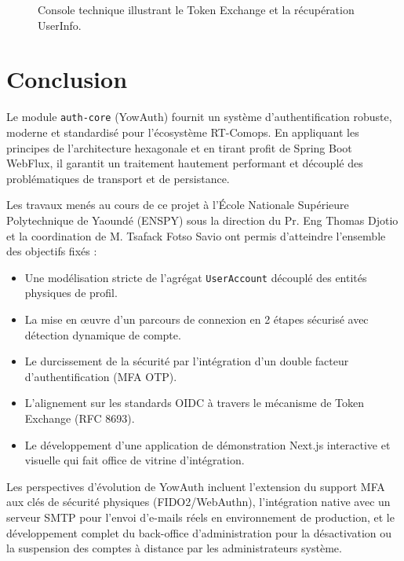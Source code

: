 \documentclass[
]{IPLeiriaThesis}
\newcommand{\code}[1]{\texttt{\small #1}}
\begin{document}
\begin{figure}[h]
  \centering
  \caption{Console technique illustrant le Token Exchange et la récupération UserInfo.}
  \label{fig:poc-sso-modal}
\end{figure}

\chapter{Conclusion}
Le module \code{auth-core} (YowAuth) fournit un système d'authentification robuste, moderne et standardisé pour l'écosystème RT-Comops. En appliquant les principes de l'architecture hexagonale et en tirant profit de Spring Boot WebFlux, il garantit un traitement hautement performant et découplé des problématiques de transport et de persistance.

Les travaux menés au cours de ce projet à l'École Nationale Supérieure Polytechnique de Yaoundé (ENSPY) sous la direction du Pr. Eng Thomas Djotio et la coordination de M. Tsafack Fotso Savio ont permis d'atteindre l'ensemble des objectifs fixés :
\begin{itemize}
  \item Une modélisation stricte de l'agrégat \code{UserAccount} découplé des entités physiques de profil.
  \item La mise en œuvre d'un parcours de connexion en 2 étapes sécurisé avec détection dynamique de compte.
  \item Le durcissement de la sécurité par l'intégration d'un double facteur d'authentification (MFA OTP).
  \item L'alignement sur les standards OIDC à travers le mécanisme de Token Exchange (RFC 8693).
  \item Le développement d'une application de démonstration Next.js interactive et visuelle qui fait office de vitrine d'intégration.
\end{itemize}

Les perspectives d'évolution de YowAuth incluent l'extension du support MFA aux clés de sécurité physiques (FIDO2/WebAuthn), l'intégration native avec un serveur SMTP pour l'envoi d'e-mails réels en environnement de production, et le développement complet du back-office d'administration pour la désactivation ou la suspension des comptes à distance par les administrateurs système.
\end{document}
